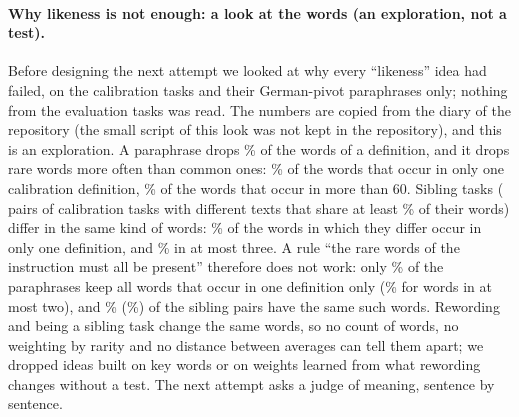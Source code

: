 \paragraph{Why likeness is not enough: a look at the words (an exploration, not a test).} Before designing the next attempt we looked at why every ``likeness'' idea had failed, on the \WidenTasksCal{} calibration tasks and their German-pivot paraphrases only; nothing from the \WidenTasksEval{} evaluation tasks was read. The numbers are
copied from the diary of the repository (the small script of this look was not kept in the repository), and this is an exploration. A paraphrase drops \WidenExploreDropShare{}\% of the words of a definition, and it drops rare words more often than common ones: \WidenExploreDropRare{}\% of the words that occur in only one calibration definition, \WidenExploreDropCommon{}\% of the words that occur in more than 60.
Sibling tasks (\WidenExploreSiblingPairs{} pairs of calibration tasks with different texts that share at least \WidenExploreSiblingSharedMin{}\% of their words) differ in the same kind of words: \WidenExploreSiblingRare{}\% of the words in which they differ occur in only one definition, and \WidenExploreSiblingFew{}\% in at most three. A rule ``the rare words of the instruction must all be present'' therefore does not work: only \WidenExploreKeepAllOne{}\% of the paraphrases keep all words that occur in one definition only
(\WidenExploreKeepAllTwo{}\% for words in at most two), and \WidenExploreSiblingSameOne{}\% (\WidenExploreSiblingSameTwo{}\%) of the sibling pairs have the same such words. Rewording and being a sibling task change the same words, so no count of words, no weighting by rarity and no distance between averages can tell them apart; we dropped ideas built on key words or on weights learned from what rewording changes without a test.
The next attempt asks a judge of meaning, sentence by sentence.

